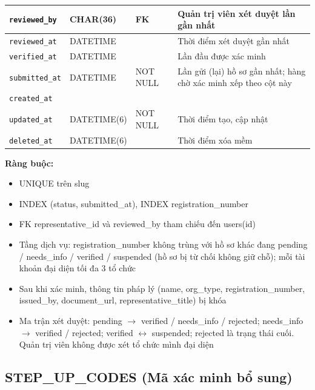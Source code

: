 {\begin{longtable}{|P{3.2cm}|P{2.8cm}|P{2.2cm}|p{5.4cm}|}
    \hline
    \texttt{reviewed\_\allowbreak{}by} & CHAR(36) & FK & Quản trị viên xét duyệt lần gần nhất \\
    \hline
    \texttt{reviewed\_\allowbreak{}at} & DATETIME &  & Thời điểm xét duyệt gần nhất \\
    \hline
    \texttt{verified\_\allowbreak{}at} & DATETIME &  & Lần đầu được xác minh \\
    \hline
    \texttt{submitted\_\allowbreak{}at} & DATETIME & NOT NULL & Lần gửi (lại) hồ sơ gần nhất; hàng chờ xác minh xếp theo cột này \\
    \hline
    \texttt{created\_\allowbreak{}at} &  &  &  \\
    \hline
    \texttt{updated\_\allowbreak{}at} & DATETIME(6) & NOT NULL & Thời điểm tạo, cập nhật \\
    \hline
    \texttt{deleted\_\allowbreak{}at} & DATETIME(6) &  & Thời điểm xóa mềm \\
    \hline
\end{longtable}
}

\textbf{Ràng buộc:}
\begin{itemize}
    \item UNIQUE trên slug
    \item INDEX (status, submitted\_\allowbreak{}at), INDEX registration\_\allowbreak{}number
    \item FK representative\_\allowbreak{}id và reviewed\_\allowbreak{}by tham chiếu đến users(id)
    \item Tầng dịch vụ: registration\_\allowbreak{}number không trùng với hồ sơ khác đang pending / needs\_\allowbreak{}info / verified / suspended (hồ sơ bị từ chối không giữ chỗ); mỗi tài khoản đại diện tối đa 3 tổ chức
    \item Sau khi xác minh, thông tin pháp lý (name, org\_\allowbreak{}type, registration\_\allowbreak{}number, issued\_\allowbreak{}by, document\_\allowbreak{}url, representative\_\allowbreak{}title) bị khóa
    \item Ma trận xét duyệt: pending $\rightarrow$ verified / needs\_\allowbreak{}info / rejected; needs\_\allowbreak{}info $\rightarrow$ verified / rejected; verified $\leftrightarrow$ suspended; rejected là trạng thái cuối. Quản trị viên không được xét tổ chức mình đại diện
\end{itemize}

\subsection{STEP\_\allowbreak{}UP\_\allowbreak{}CODES (Mã xác minh bổ sung)}

